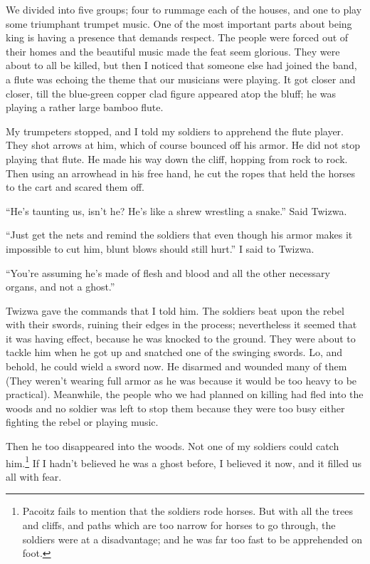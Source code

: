 We divided into five groups; four to rummage each of the houses, and one to play some triumphant trumpet music. One of the most important parts about being king is having a presence that demands respect.
The people were forced out of their homes and the beautiful music made the feat seem glorious. They were about to all be killed, but then I noticed that someone else had joined the band, a flute was echoing the theme that our musicians were playing. It got closer and closer, till the blue-green copper clad figure appeared atop the bluff; he was playing a rather large bamboo flute.

My trumpeters stopped, and I told my soldiers to apprehend the flute player. They shot arrows at him, which of course bounced off his armor. He did not stop playing that flute. He made his way down the cliff, hopping from rock to rock. Then using an arrowhead in his free hand, he cut the ropes that held the horses to the cart and scared them off.

``He's taunting us, isn't he? He's like a shrew wrestling a snake.'' Said Twizwa.

``Just get the nets and remind the soldiers that even though his armor makes it impossible to cut him, blunt blows should still hurt.'' I said to Twizwa.

``You're assuming he's made of flesh and blood and all the other necessary organs, and not a ghost.''

Twizwa gave the commands that I told him. The soldiers beat upon the rebel with their swords, ruining their edges in the process; nevertheless it seemed that it was having effect, because he was knocked to the ground. They were about to tackle him when he got up and snatched one of the swinging swords. Lo, and behold, he could wield a sword now. He disarmed and wounded many of them (They weren't wearing full armor as he was because it would be too heavy to be practical). Meanwhile, the people who we had planned on killing had fled into the woods and no soldier was left to stop them because they were too busy either fighting the rebel or playing music.

Then he too disappeared into the woods. Not one of my soldiers could catch him.\footnote{Pacoitz fails to mention that the soldiers rode horses. But with all the trees and cliffs, and paths which are too narrow for horses to go through, the soldiers were at a disadvantage; and he was far too fast to be apprehended on foot.} If I hadn't believed he was a ghost before, I believed it now, and it filled us all with fear.

